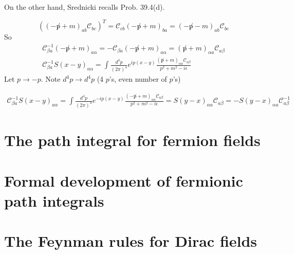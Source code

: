 \documentclass[twoside]{amsart}
\begin{document}
On the other hand, Srednicki recalls Prob. 39.4(d).  

\[
((-\not p + m)_{ab} \mathcal{C}_{bc} )^T = \mathcal{C}_{cb} ( - \not p + m )_{ba} = (-\not p - m)_{ab} \mathcal{C}_{bc}
\]
So 
\[
\begin{gathered}
  \mathcal{C}^{-1}_{\beta a}(- \not p + m )_{a\alpha} = - \mathcal{C}_{\beta a }(- \not p + m)_{a \alpha } = ( \not p + m)_{\alpha a } \mathcal{C}_{a \beta} \\
   \mathcal{C}^{-1}_{\beta a} S(x-y)_{a\alpha} = \int \frac{d^4p }{(2\pi)^4} e^{i p(x-y)} \frac{ (\not p + m)_{\alpha a} \mathcal{C}_{a \beta } }{ p^2 + m^2 - i \epsilon }
\end{gathered}
\]
Let $p \to - p$. Note $d^4p \to d^4p$ (4 $p$'s, even number of $p$'s)

\[
\begin{gathered}
  \mathcal{C}^{-1}_{\beta a} S(x-y)_{a\alpha} = \int \frac{d^4p }{ (2\pi)^4} e^{-ip (x-y) } \frac{ ( - \not p + m)_{\alpha a} \mathcal{C}_{a \beta } }{ p^2 + m^2 - i \epsilon } = S(y-x)_{\alpha a} \mathcal{C}_{a \beta} =\boxed{  - S(y-x)_{\alpha a } \mathcal{C}^{-1}_{a\beta} }
\end{gathered}
\]


\section{The path integral for fermion fields}

\section{Formal development of fermionic path integrals}

\section{The Feynman rules for Dirac fields}
\end{document}
